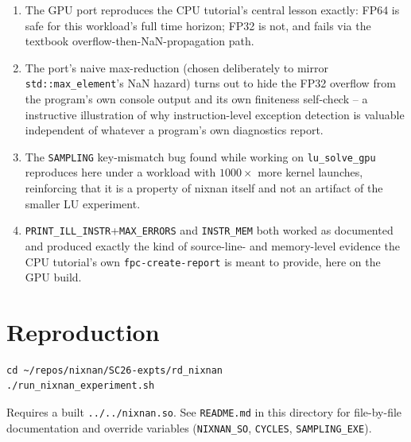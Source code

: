 \documentclass[11pt,a4paper]{article}
\begin{document}
\begin{enumerate}
  \item The GPU port reproduces the CPU tutorial's central lesson exactly:
    FP64 is safe for this workload's full time horizon; FP32 is not, and
    fails via the textbook overflow-then-NaN-propagation path.
  \item The port's naive max-reduction (chosen deliberately to mirror
    \texttt{std::max\_element}'s NaN hazard) turns out to hide the FP32
    overflow from the program's own console output and its own
    finiteness self-check -- a instructive illustration of why
    instruction-level exception detection is valuable independent of
    whatever a program's own diagnostics report.
  \item The \texttt{SAMPLING} key-mismatch bug found while working on
    \texttt{lu\_solve\_gpu} reproduces here under a workload with $1000\times$
    more kernel launches, reinforcing that it is a property of nixnan
    itself and not an artifact of the smaller LU experiment.
  \item \texttt{PRINT\_ILL\_INSTR}+\texttt{MAX\_ERRORS} and
    \texttt{INSTR\_MEM} both worked as documented and produced exactly the
    kind of source-line- and memory-level evidence the CPU tutorial's own
    \texttt{fpc-create-report} is meant to provide, here on the GPU build.
\end{enumerate}

\section*{Reproduction}

\begin{lstlisting}
cd ~/repos/nixnan/SC26-expts/rd_nixnan
./run_nixnan_experiment.sh
\end{lstlisting}

\noindent Requires a built \texttt{../../nixnan.so}. See \texttt{README.md}
in this directory for file-by-file documentation and override variables
(\texttt{NIXNAN\_SO}, \texttt{CYCLES}, \texttt{SAMPLING\_EXE}).
\end{document}
